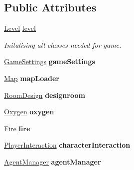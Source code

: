 \subsection*{Public Attributes}
\begin{DoxyCompactItemize}
\item 
\mbox{\label{class_space_game_a13b9266a848dbbd36811fcd958c14e72}} 
\hyperlink{class_level}{Level} \hyperlink{class_space_game_a13b9266a848dbbd36811fcd958c14e72}{level}
\begin{DoxyCompactList}\small\item\em Initalising all classes needed for game. \end{DoxyCompactList}\item 
\mbox{\label{class_space_game_abb8dbac6e9bf0c31d618be71dec942f5}} 
\hyperlink{class_game_settings}{Game\+Settings} {\bfseries game\+Settings}
\item 
\mbox{\label{class_space_game_ad10824caf8335c970fc6031ead3a63a8}} 
\hyperlink{class_map}{Map} {\bfseries map\+Loader}
\item 
\mbox{\label{class_space_game_a33e95e1290f822fe6568da5b8493f186}} 
\hyperlink{class_room_design}{Room\+Design} {\bfseries designroom}
\item 
\mbox{\label{class_space_game_a97f7eec404779c9a0ac068ee22afec93}} 
\hyperlink{class_oxygen}{Oxygen} {\bfseries oxygen}
\item 
\mbox{\label{class_space_game_ac42eea67a31352b71500da32875b66b9}} 
\hyperlink{class_fire}{Fire} {\bfseries fire}
\item 
\mbox{\label{class_space_game_ab726e64a5e0e2a1847473d8e8528a1c8}} 
\hyperlink{class_player_interaction}{Player\+Interaction} {\bfseries character\+Interaction}
\item 
\mbox{\label{class_space_game_a23ccc84ea819eeb2d2eab875fd8a4fe8}} 
\hyperlink{class_agent_manager}{Agent\+Manager} {\bfseries agent\+Manager}
\item 
\mbox{\label{class_space_game_ac09355a77f5c400853bbcd5a197f1048}} 

\end{DoxyCompactItemize}
